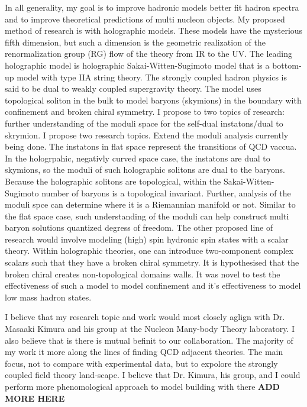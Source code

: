 \documentclass[12pt]{article}
\begin{document}
In all generality, my goal is to improve hadronic models better fit hadron spectra and to improve theoretical predictions of multi nucleon objects. 
%
My proposed method of research is with holographic models.
%
These models have the mysterious fifth dimension, but such a dimension is the geometric realization of the renormalization group (RG) flow of the theory from IR to the UV.
%
The leading holographic model is holographic Sakai-Witten-Sugimoto model that is a bottom-up model with type IIA string theory.
%
The strongly coupled hadron physics is said to be dual to weakly coupled supergravity theory.
%
The model uses topological soliton in the bulk to model baryons (skymions) in the boundary with confinement and broken chiral symmetry.
%
I propose to two topics of research: further understanding of the moduli space for the self-dual instatons/dual to skrymion.
%
I propose two research topics.
%
Extend the moduli analysis currently being done.
%
The instatons in flat space represent the transitions of QCD vaccua.
%
In the hologrpahic, negativly curved space case, the instatons are dual to skymions, so the moduli of such holographic solitons are dual to the baryons.
%
Because the holographic solitons are topological, within the Sakai-Witten-Sugimoto number of baryons is a topological invariant.
%
Further, analysis of the moduli spce can determine where it is a Riemannian manifold or not.
%
Similar to the flat space case, such understanding of the moduli can help construct multi baryon solutions quantized degress of freedom.
%
The other proposed line of research would involve modeling (high) spin hydronic spin states with a scalar theory.
%
Within holographic theories, one can introduce two-component complex scalars such that they have a broken chiral symmetry.
%
It is hypothesised that the broken chiral creates non-topological domains walls.
%
It was novel to test the effectiveness of such a model to model confinement and it's effectiveness to model low mass hadron states.

I believe that my research topic and work would most closely aglign with Dr. Masaaki Kimura and his group at the Nucleon Many-body Theory laboratory.
%
I also believe that is there is mutual befinit to our collaboration.
%
The majority of my work it more along the lines of finding QCD adjacent theories.
%
The main focus, not to compare with experimental data, but to expolore the strongly coupled field theory land-scape.
%
I believe that Dr. Kimura, his group, and I could perform more phenomological approach to model building with there
%
\large{\bf{ADD MORE HERE}}
\end{document}
